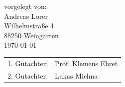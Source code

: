 \begin{titlepage}
\begin{center}
  vorgelegt von:\\[5mm]
  {\Large Andreas Lorer} \\[5mm]
    Wilhelmstraße 4\\
    88250 Weingarten\\
    \today \\[2cm]
  {\normalsize
    \begin{tabular}{rl}
    1. Gutachter:   & Prof. Klemens Ehret \\
    2. Gutachter:   & Lukas Michna\\
    \end{tabular}
  }
  \end{center}
  \vfill
\end{titlepage}
